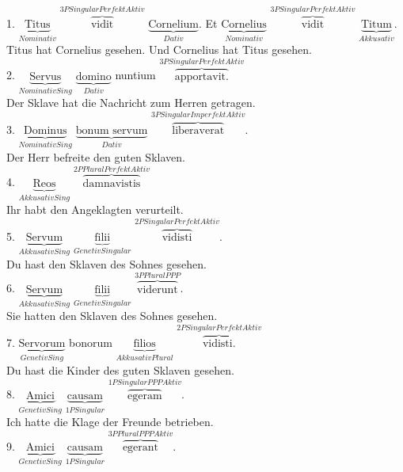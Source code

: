 \documentclass[a4paper]{article}
\newcommand{\ann}[2]{$\underbrace{\text{#1}}_{#2}$}
\newcommand{\ovv}[2]{$\overbrace{\text{#1}}^{#2}$}
\begin{document}
1. \ann{Titus}{Nominativ} \ovv{vidit}{3P Singular Perfekt Aktiv} \ann{Cornelium}{Dativ}. Et \ann{Cornelius}{Nominativ} \ovv{vidit}{3P Singular Perfekt Aktiv} \ann{Titum}{Akkusativ}.\\

Titus hat Cornelius gesehen. Und Cornelius hat Titus gesehen. \\

2. \ann{Servus}{Nominativ Sing} \ann{domino}{Dativ} nuntium \ovv{apportavit.}{3P Singular Perfekt Aktiv}  \\

Der Sklave hat die Nachricht zum Herren getragen. \\

3. \ann{Dominus}{Nominativ Sing} \ann{bonum servum}{Dativ} \ovv{liberaverat}{3P Singular Imperfekt Aktiv}. \\

Der Herr befreite den guten Sklaven. \\

4. \ann{Reos}{AkkusativSing } \ovv{damnavistis}{2P Plural Perfekt Aktiv} \\

Ihr habt den Angeklagten verurteilt. \\

5. \ann{Servum}{Akkusativ Sing} \ann{filii}{Genetiv Singular} \ovv{vidisti}{2P Singular Perfekt Aktiv}. \\

Du hast den Sklaven des Sohnes gesehen. \\

6. \ann{Servum}{Akkusativ Sing} \ann{filii}{Genetiv Singular} \ovv{viderunt}{3P Plural PPP}. \\

Sie hatten den Sklaven des Sohnes gesehen. \\

7. \ann{Servorum}{Genetiv Sing} bonorum \ann{filios}{Akkusativ Plural} \ovv{vidisti.}{2P Singular Perfekt Aktiv} \\

Du hast die Kinder des guten Sklaven gesehen. \\

8. \ann{Amici}{Genetiv Sing} \ann{causam}{1P Singular} \ovv{egeram}{1P Singular PPP Aktiv}. \\

Ich hatte die Klage der Freunde betrieben. \\

9. \ann{Amici}{Genetiv Sing} \ann{causam}{1P Singular} \ovv{egerant}{3P Plural PPP Aktiv}. \\
\end{document}
